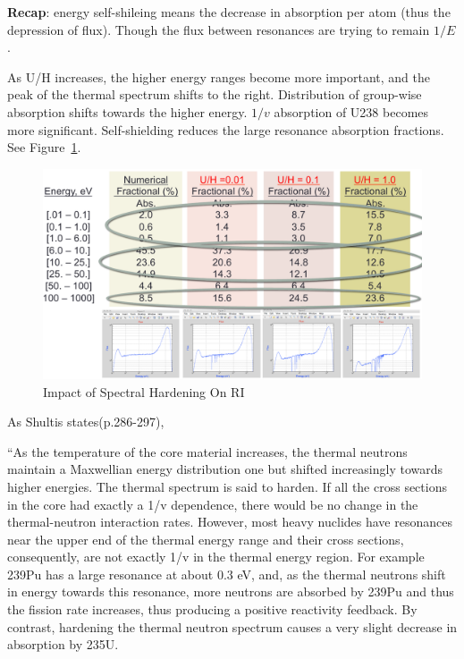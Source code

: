 \documentclass{school-22.211-notes}
\begin{document}
\textbf{Recap}: energy self-shileing means the decrease in absorption per atom (thus the depression of flux). Though the flux between resonances are trying to remain $1/E$. 

\clearpage
\label{spectral-hardening-section}
As U/H increases, the higher energy ranges become more important, and the peak of the thermal spectrum shifts to the right. Distribution of group-wise absorption shifts towards the higher energy. $1/v$ absorption of U238 becomes more significant. Self-shielding reduces the large resonance absorption fractions. See Figure~\ref{spectral-hardening}. 
\begin{figure}[ht]
  \centering
  \includegraphics[width=6in]{images/r-m/spectral-hardening.png}
  \caption{Impact of Spectral Hardening On RI} \label{spectral-hardening}
\end{figure}

As Shultis states(p.286-297),

``As the temperature of the core material increases, the thermal neutrons maintain a Maxwellian energy distribution one but shifted increasingly towards higher energies. The thermal spectrum is said to harden. If all the cross sections in the core
had exactly a 1/v dependence, there would be no change in the thermal-neutron
interaction rates. However, most heavy nuclides have resonances near the upper end
of the thermal energy range and their cross sections, consequently, are not exactly
1/v in the thermal energy region. For example 239Pu has a large resonance at about 0.3 eV, and, as the thermal neutrons shift in energy towards this resonance, more neutrons are absorbed by 239Pu and thus the fission rate increases, thus producing a positive reactivity feedback. By contrast, hardening the thermal neutron spectrum causes a very slight decrease in absorption by 235U. 
\end{document}
